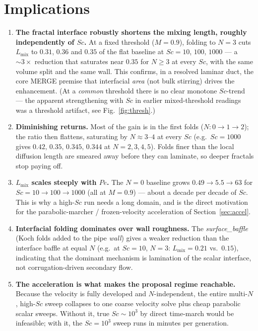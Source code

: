 \documentclass[11pt]{article}
\newcommand{\Sc}{\mathit{Sc}}
\newcommand{\Pe}{\mathit{Pe}}
\begin{document}
\section{Implications}
\label{sec:implications}

\begin{enumerate}\itemsep3pt
\item \textbf{The fractal interface robustly shortens the mixing length,
  roughly independently of $\Sc$.} At a fixed threshold ($M=0.9$), folding
  to $N=3$ cuts $L_{\mathrm{mix}}$ to $0.31$, $0.36$ and $0.35$ of the flat
  baseline at $\Sc=10$, $100$, $1000$ --- a $\sim\!3\times$ reduction that
  saturates near $0.35$ for $N\ge3$ at every $\Sc$, with the same volume
  split and the same wall. This confirms, in a resolved laminar duct, the
  core MERGE premise that interfacial \emph{area} (not bulk stirring)
  drives the enhancement. (At a \emph{common} threshold there is no clear
  monotone $\Sc$-trend --- the apparent strengthening with $\Sc$ in
  earlier mixed-threshold readings was a threshold artifact, see
  Fig.~\ref{fig:thresh}.)
\item \textbf{Diminishing returns.} Most of the gain is in the first folds
  ($N\!:0\!\to\!1\!\to\!2$); the ratio then flattens, saturating by
  $N\!\approx\!3$--$4$ at every $\Sc$ (e.g.\ $\Sc=1000$ gives
  $0.42,\,0.35,\,0.345,\,0.344$ at $N=2,3,4,5$). Folds finer than the
  local diffusion length are smeared away before they can laminate, so
  deeper fractals stop paying off.
\item \textbf{$L_{\mathrm{mix}}$ scales steeply with $\Pe$.}
  The $N=0$ baseline grows $0.49\!\to\!5.5\!\to\!63$ for
  $\Sc=10\!\to\!100\!\to\!1000$ (all at $M=0.9$) --- about a decade per
  decade of $\Sc$. This is why a high-$\Sc$ run needs a long domain, and is
  the direct motivation for the parabolic-marcher / frozen-velocity
  acceleration of Section~\ref{sec:accel}.
\item \textbf{Interfacial folding dominates over wall roughness.} The
  \emph{surface\_baffle} (Koch folds added to the pipe \emph{wall}) gives
  a weaker reduction than the interface baffle at equal $N$ (e.g.\ at
  $\Sc=10$, $N=3$: $L_{\mathrm{mix}}=0.21$ vs.\ $0.15$), indicating that
  the dominant mechanism is lamination of the scalar interface, not
  corrugation-driven secondary flow.
\item \textbf{The acceleration is what makes the proposal regime
  reachable.} Because the velocity is fully developed and $N$-independent,
  the entire multi-$N$, high-$\Sc$ sweep collapses to one coarse velocity
  solve plus cheap parabolic scalar sweeps. Without it, true $\Sc\sim10^3$
  by direct time-march would be infeasible; with it, the $\Sc=10^3$ sweep
  runs in minutes per generation.
\end{enumerate}
\end{document}
